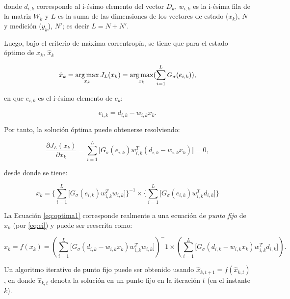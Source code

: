 donde $d_{i, k}$ corresponde al i-\'esimo elemento del vector $D_k$, $w_{i,k}$ es la i-\'esima fila de la matriz $W_k$ y $L$ es la suma de las dimensiones de los vectores de estado ($x_k$), $N$  y medici\'on ($y_k$), $N'$; es decir $L=N+N'$.

Luego, bajo el criterio de m\'axima correntrop\'ia, se tiene que para el estado \'optimo de $x_k$, $\hat{x}_k$

\begin{equation}
\hat{x}_k = \operatorname*{arg\,max}_{x_k} J_{L}(x_k)= \operatorname*{arg\,max}_{x_k} (\sum_{i=1}^L G_{\sigma} (e_{i,k})),
\label{eq:max}
\end{equation}
\bigskip

en que $e_{i,k}$ es el i-\'esimo elemento de $e_k$:

\begin{equation}
e_{i,k}= d_{i, k} - w_{i,k}x_k.
\label{eq:ei}
\end{equation}

Por tanto, la soluci\'on \'optima puede obtenerse resolviendo:

\begin{equation}
\dfrac{\partial J_L(x_k)}{\partial x_k} = \sum_{i=1}^L \lbrack G_{\sigma}(e_{i,k}) w_{i, k}^T (d_{i,k} -w_{i,k}x_k)  \rbrack =0, 
\label{eq:optimal}
\end{equation}
\bigskip

desde donde se tiene:

\begin{equation}
x_k = \lbrace \sum_{i=1}^L \lbrack G_{\sigma} (e_{i,k}) w_{i,k}^T w_{i,k} \rbrack \rbrace^{-1} \times
\lbrace \sum_{i=1}^L \lbrack G_{\sigma} (e_{i,k}) w_{i,k}^T d_{i,k} \rbrack \rbrace
\label{eq:optima1}
\end{equation}

La Ecuaci\'on \ref{eq:optima1} corresponde realmente a una ecuaci\'on de \textit{punto fijo} de $x_k$ (por \ref{eq:ei}) y puede ser reescrita como:

\begin{equation}
x_k = f(x_k) = \left( \sum_{i=1}^{L} \lbrack G_{\sigma} (d_{i,k} - w_{i,k}x_k) w_{i,k}^T w_{i,k}  \rbrack \right)^-1 \times \left( \sum_{i=1}^{L} \lbrack G_{\sigma} (d_{i,k} - w_{i,k}x_k) w_{i,k}^T d_{i,k}  \rbrack \right).
\label{eq:optimal2}
\end{equation}
\bigskip

Un algoritmo iterativo de punto fijo puede ser obtenido usando $\hat{x}_{k, t+1} = f(\hat{x}_{k, t})$, en donde $\hat{x}_{k, t}$ denota la soluci\'on en un punto fijo en la iteraci\'on $t$ (en el instante $k$).
\bigskip

